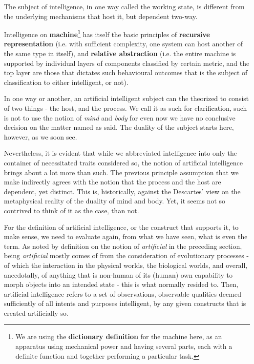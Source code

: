\begin{hypothesis}
    The subject of intelligence, in one way called the working state, is different from the underlying mechanisms that host it, but dependent two-way.
\end{hypothesis}

\begin{hypothesis}
    Intelligence on \textbf{machine}\footnote{We are using the \textbf{dictionary definition} for the machine here, as an apparatus using mechanical power and having several parts, each with a definite function and together performing a particular task.} has itself the basic principles of \textbf{recursive representation} (i.e. with sufficient complexity, one system can host another of the same type in itself), and \textbf{relative abstraction} (i.e. the entire machine is supported by individual layers of components classified by certain metric, and the top layer are those that dictates such behavioural outcomes that is the subject of classification to either intelligent, or not).
\end{hypothesis}

In one way or another, an artificial intelligent subject can the theorized to consist of two things - the host, and the process. We call it as such for clarification, such is not to use the notion of \textit{mind} and \textit{body} for even now we have no conclusive decision on the matter named as said. The duality of the subject starts here, however, as we soon see.

Nevertheless, it is evident that while we abbreviated intelligence into only the container of necessitated traits considered so, the notion of artificial intelligence brings about a lot more than such. The previous principle assumption that we make indirectly agrees with the notion that the process and the host are dependent, yet distinct. This is, historically, against the Descartes' view on the metaphysical reality of the duality of mind and body. Yet, it seems not so contrived to think of it as the case, than not.

For the definition of artificial intelligence, or the construct that supports it, to make sense, we need to evaluate again, from what we have seen, what is even the term. As noted by definition on the notion of \textit{artificial} in the preceding section, being \textit{artificial} mostly comes of from the consideration of evolutionary processes - of which the interaction in the physical worlds, the biological worlds, and overall, anecdotally, of anything that is non-human of its (human) own capability to morph objects into an intended state - this is what normally resided to. Then, artificial intelligence refers to a set of observations, observable qualities deemed sufficiently of all intents and purposes intelligent, by any given constructs that is created artificially so.


